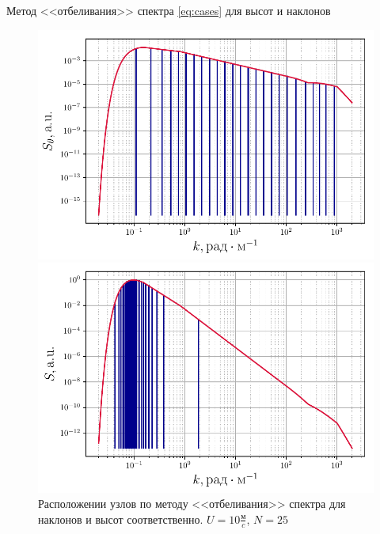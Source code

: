 \begin{frame}[t]{}
\begin{columns}[t]
\begin{column}{.48\linewidth}
\begin{block}{Метод <<отбеливания>> спектра}
                \eqref{eq:cases} для высот и наклонов
                \begin{figure}[H]
                    \begin{minipage}{0.49\linewidth}
                            \centering
                            \includegraphics[width=\linewidth]{fig/split_angles}	
                    \end{minipage}
                    \hfill
                    \begin{minipage}{0.49\linewidth}
                            \centering
                            \includegraphics[width=\linewidth]{fig/split_height}
                    \end{minipage}
                    \caption{Расположении узлов по методу <<отбеливания>> спектра  для наклонов и высот соответственно. $U=10 \frac{\text{м}}{c}$, $N=25$}
                    \label{fig:splits}		
                \end{figure}
        \end{block}
      \end{column}
    \end{columns}
  \end{frame}


